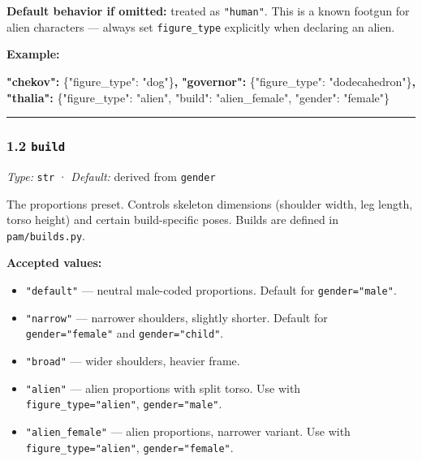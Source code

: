 \documentclass[
  12pt,
  letterpaper,
]{book}
\newenvironment{Shaded}{}{}
\newcommand{\DataTypeTok}[1]{\textcolor[rgb]{0.56,0.13,0.00}{#1}}
\newcommand{\ErrorTok}[1]{\textcolor[rgb]{1.00,0.00,0.00}{\textbf{#1}}}
\newcommand{\FunctionTok}[1]{\textcolor[rgb]{0.02,0.16,0.49}{#1}}
\newcommand{\StringTok}[1]{\textcolor[rgb]{0.25,0.44,0.63}{#1}}
\providecommand{\tightlist}{%
  \setlength{\itemsep}{0pt}\setlength{\parskip}{0pt}}
\begin{document}
\textbf{Default behavior if omitted:} treated as \texttt{"human"}. This
is a known footgun for alien characters --- always set
\texttt{figure\_type} explicitly when declaring an alien.

\textbf{Example:}

\begin{Shaded}
\begin{Highlighting}[]
\ErrorTok{"chekov":}   \FunctionTok{\{}\DataTypeTok{"figure\_type"}\FunctionTok{:} \StringTok{"dog"}\FunctionTok{\}}\ErrorTok{,}
\ErrorTok{"governor":} \FunctionTok{\{}\DataTypeTok{"figure\_type"}\FunctionTok{:} \StringTok{"dodecahedron"}\FunctionTok{\}}\ErrorTok{,}
\ErrorTok{"thalia":}   \FunctionTok{\{}\DataTypeTok{"figure\_type"}\FunctionTok{:} \StringTok{"alien"}\FunctionTok{,} \DataTypeTok{"build"}\FunctionTok{:} \StringTok{"alien\_female"}\FunctionTok{,} \DataTypeTok{"gender"}\FunctionTok{:} \StringTok{"female"}\FunctionTok{\}}
\end{Highlighting}
\end{Shaded}

\begin{center}\rule{0.5\linewidth}{0.5pt}\end{center}

\subsubsection{\texorpdfstring{1.2
\texttt{build}}{1.2 build}}\label{build}

\emph{Type:} \texttt{str} · \emph{Default:} derived from \texttt{gender}

The proportions preset. Controls skeleton dimensions (shoulder width,
leg length, torso height) and certain build-specific poses. Builds are
defined in \texttt{pam/builds.py}.

\textbf{Accepted values:}

\begin{itemize}
\tightlist
\item
  \texttt{"default"} --- neutral male-coded proportions. Default for
  \texttt{gender="male"}.
\item
  \texttt{"narrow"} --- narrower shoulders, slightly shorter. Default
  for \texttt{gender="female"} and \texttt{gender="child"}.
\item
  \texttt{"broad"} --- wider shoulders, heavier frame.
\item
  \texttt{"alien"} --- alien proportions with split torso. Use with
  \texttt{figure\_type="alien"}, \texttt{gender="male"}.
\item
  \texttt{"alien\_female"} --- alien proportions, narrower variant. Use
  with \texttt{figure\_type="alien"}, \texttt{gender="female"}.
\end{itemize}
\end{document}
